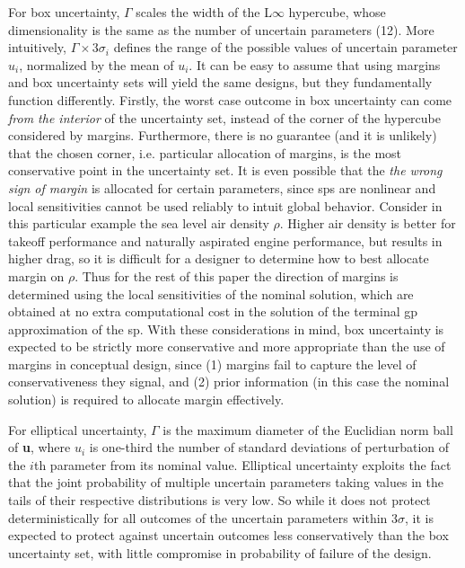 For box uncertainty,
$\Gamma$ scales the width of the L$\infty$ hypercube, whose dimensionality is the same as the number of uncertain parameters (12).
More intuitively, $\Gamma \times 3\sigma_i$ defines the range of the possible values of uncertain parameter $u_i$,
normalized by the mean of $u_i$.
It can be easy to assume that using margins and box uncertainty sets will yield the same designs,
but they fundamentally function differently.
Firstly, the worst case outcome in box uncertainty can come \emph{from the interior} of the uncertainty
set, instead of the corner of the hypercube considered
by margins. Furthermore, there is no guarantee (and it is unlikely)
that the chosen corner, i.e. particular allocation of margins,
is the most conservative point in the uncertainty set.
It is even possible that the \emph{the wrong sign of margin} is allocated for certain parameters,
since \gls{sp}s are nonlinear and local sensitivities cannot be used reliably to intuit global behavior. {\color{blue}Consider
in this particular example the sea level air density $\rho$.
Higher air density is better for takeoff performance and naturally aspirated engine performance,
but results in higher drag, so it is difficult
for a designer to determine how to best allocate margin on $\rho$.} Thus for the rest
of this paper the direction of margins is determined using the local sensitivities of the nominal solution,
which are obtained at no extra computational cost in the solution of the terminal \gls{gp} approximation of the \gls{sp}.
With these considerations in mind, box uncertainty is expected to be strictly more conservative
and more appropriate than the use of margins
in conceptual design, since (1) margins fail to capture the level of conservativeness they signal, and (2) prior
information (in this case the nominal solution) is required to allocate margin effectively.

For elliptical uncertainty, $\Gamma$ is the maximum diameter of the Euclidian norm
ball of \textbf{u}, where $u_i$ is {\color{blue}one-third} the number of standard deviations of perturbation of the
$i$th parameter from its nominal value.
Elliptical uncertainty exploits the fact that the joint probability of
multiple uncertain parameters taking values in the tails of their respective distributions is
very low. So while it does not protect deterministically for all outcomes of the uncertain
parameters within $3\sigma$, it is expected to protect against uncertain outcomes
less conservatively than the box uncertainty set, with little compromise in probability of failure
of the design.
